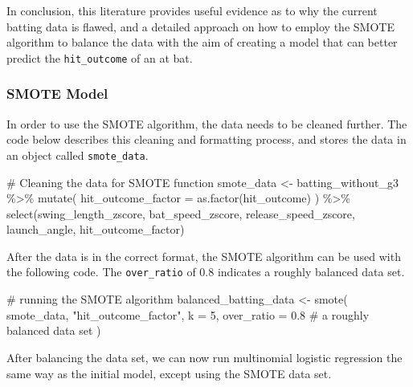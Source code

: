 \documentclass[
  letterpaper,
  DIV=11,
  numbers=noendperiod]{scrartcl}
\newenvironment{Shaded}{\begin{snugshade}}{\end{snugshade}}
\newcommand{\AttributeTok}[1]{\textcolor[rgb]{0.40,0.45,0.13}{#1}}
\newcommand{\CommentTok}[1]{\textcolor[rgb]{0.37,0.37,0.37}{#1}}
\newcommand{\DecValTok}[1]{\textcolor[rgb]{0.68,0.00,0.00}{#1}}
\newcommand{\FloatTok}[1]{\textcolor[rgb]{0.68,0.00,0.00}{#1}}
\newcommand{\FunctionTok}[1]{\textcolor[rgb]{0.28,0.35,0.67}{#1}}
\newcommand{\NormalTok}[1]{\textcolor[rgb]{0.00,0.23,0.31}{#1}}
\newcommand{\OtherTok}[1]{\textcolor[rgb]{0.00,0.23,0.31}{#1}}
\newcommand{\SpecialCharTok}[1]{\textcolor[rgb]{0.37,0.37,0.37}{#1}}
\newcommand{\StringTok}[1]{\textcolor[rgb]{0.13,0.47,0.30}{#1}}
\begin{document}
In conclusion, this literature provides useful evidence as to why the
current batting data is flawed, and a detailed approach on how to employ
the SMOTE algorithm to balance the data with the aim of creating a model
that can better predict the \texttt{hit\_outcome} of an at bat.

\newpage

\subsubsection{SMOTE Model}\label{smote-model}

In order to use the SMOTE algorithm, the data needs to be cleaned
further. The code below describes this cleaning and formatting process,
and stores the data in an object called \texttt{smote\_data}.

\begin{Shaded}
\begin{Highlighting}[]
\CommentTok{\# Cleaning the data for SMOTE function }
\NormalTok{smote\_data }\OtherTok{\textless{}{-}}\NormalTok{ batting\_without\_g3 }\SpecialCharTok{\%\textgreater{}\%}
  \FunctionTok{mutate}\NormalTok{(}
    \AttributeTok{hit\_outcome\_factor =} \FunctionTok{as.factor}\NormalTok{(hit\_outcome)}
\NormalTok{  ) }\SpecialCharTok{\%\textgreater{}\%}
  \FunctionTok{select}\NormalTok{(swing\_length\_zscore,}
\NormalTok{         bat\_speed\_zscore,}
\NormalTok{         release\_speed\_zscore,}
\NormalTok{         launch\_angle,}
\NormalTok{         hit\_outcome\_factor)}
\end{Highlighting}
\end{Shaded}

After the data is in the correct format, the SMOTE algorithm can be used
with the following code. The \texttt{over\_ratio} of 0.8 indicates a
roughly balanced data set.

\begin{Shaded}
\begin{Highlighting}[]
\CommentTok{\# running the SMOTE algorithm }
\NormalTok{balanced\_batting\_data }\OtherTok{\textless{}{-}}
  \FunctionTok{smote}\NormalTok{(}
\NormalTok{    smote\_data,}
    \StringTok{"hit\_outcome\_factor"}\NormalTok{,}
    \AttributeTok{k =} \DecValTok{5}\NormalTok{,}
    \AttributeTok{over\_ratio =} \FloatTok{0.8} \CommentTok{\# a roughly balanced data set }
\NormalTok{  )}
\end{Highlighting}
\end{Shaded}

After balancing the data set, we can now run multinomial logistic
regression the same way as the initial model, except using the SMOTE
data set.
\end{document}
